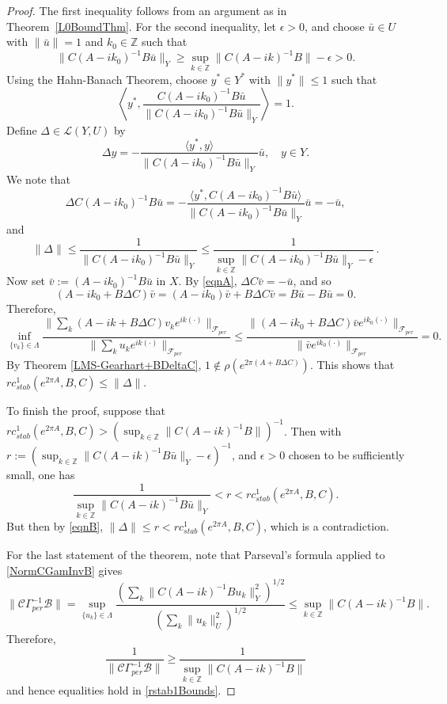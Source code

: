 \documentclass[10pt,psamsfonts,leqno]{siamltex}
\newcommand{\bbZ}{\mathbb{Z}}
\newcommand{\calB}{\mathcal{B}}
\newcommand{\calC}{\mathcal{C}}
\newcommand{\lb}{\label}
\newcommand{\rcstab}{rc_{stab}}
\newcommand{\Gammaper}{\Gamma_{per}}
\newcommand{\Fper}{{\mathcal{F}_{per}}}
\begin{document}
\begin{proof}  The first inequality follows from an argument as in
Theorem~\ref{L0BoundThm}.  For the second inequality, let $\epsilon>0$,
and choose $\bar u\in U$ with $\|\bar u\|=1$ and $k_0\in\bbZ$ such that
\[
\|C(A-ik_0)^{-1}B\bar{u}\|_Y\ge
\sup_{k\in\bbZ}\|C(A-ik)^{-1}B\|-\epsilon>0.
\]
Using the Hahn-Banach Theorem, choose $y^*\in Y^*$ with
$\|y^*\|\le 1$ such that
\[
\left\langle y^*,\frac{C(A-ik_0)^{-1}B\bar{u}}
{\|C(A-ik_0)^{-1}B\bar{u}\|_Y}\right\rangle=1.
\]
Define $\Delta\in \mathcal{L}(Y,U)$ by
\[
\Delta y =
   -\frac{\langle y^*,y\rangle}{\|C(A-ik_0)^{-1}B\bar u\|_Y}\bar{u},
\quad y\in Y.
\]
We note that
\begin{equation}\lb{eqnA}
\Delta C(A-ik_0)^{-1}B\bar u=
-\frac{\langle y^*,C(A-ik_0)^{-1}B\bar u\rangle}
{\|C(A-ik_0)^{-1}B\bar{u}\|_Y}\bar u=-\bar{u},
\end{equation}
and
\begin{equation}\lb{eqnB}
\|\Delta\|\le\frac{1}{\|C(A-ik_0)^{-1}B\bar{u}\|_Y}
\le\frac{1}{\sup_{k\in\bbZ}\|C(A-ik_0)^{-1}B\bar{u}\|_Y-\epsilon}\, .
\end{equation}
Now set $\bar{v}:= (A-ik_0)^{-1}B\bar u$ in $X$.  By \eqref{eqnA},
$\Delta C\bar{v}=-\bar{u}$, and so
\[ (A-ik_0+B\Delta C)\bar{v}
=(A-ik_0)\bar{v}+B\Delta C\bar{v}=B\bar{u}- B\bar{u}=0.\]
Therefore,
\begin{equation*}
\inf_{\{v_k\}\in\Lambda}\frac{\|\sum_k(A-ik+B\Delta C)
   v_ke^{ik(\cdot)}\|_\Fper}{\|\sum_ku_ke^{ik(\cdot)}\|_\Fper}
\le \frac{\|(A-ik_0+B\Delta C)
   \bar{v}e^{ik_0(\cdot)}\|_\Fper}{\|\bar{v}e^{ik_0(\cdot)}\|_\Fper} =0.
\end{equation*}
By Theorem \ref{LMS-Gearhart+BDeltaC},
$1\notin\rho(e^{2\pi(A+B\Delta C)})$.  This shows that
$\rcstab^1(e^{2\pi A},B,C)\le\|\Delta\|$.

To finish the proof, suppose that
$ \rcstab^1(e^{2\pi A},B,C)>(\sup_{k\in\bbZ}\|C(A-ik)^{-1}B\|)^{-1}$.
Then with
$r:=(\sup_{k\in\bbZ}\|C(A-ik)^{-1}B\bar{u}\|_Y-\epsilon)^{-1}$,
 and $\epsilon>0$ chosen to be sufficiently small,
one has
\[ \frac{1}{\sup_{k\in\bbZ}\|C(A-ik)^{-1}B\bar{u}\|_Y}< r <
\rcstab^1(e^{2\pi A},B,C).
\]
But then by \eqref{eqnB}, $\|\Delta\|\le r < \rcstab^1(e^{2\pi A},B,C)$,
which is a contradiction.

For the last statement of the theorem, note that Parseval's formula
applied to
\eqref{NormCGamInvB} gives
\begin{equation}\label{ParForm}
\|\calC\Gammaper^{-1}\calB\|=\sup_{\{u_k\}\in\Lambda}
   \frac{\left(\sum_k\| C(A-ik)^{-1}Bu_k\|^2_Y\right)^{1/2}}
       {\left(\sum_k \|u_k\|^2_U\right)^{1/2}}
\le \sup_{k\in\bbZ}\|C(A-ik)^{-1}B\|.
\end{equation}
Therefore,
\[
\frac{1}{\|\calC\Gammaper^{-1}\calB\|}\ge
\frac{1}{\sup_{k\in\bbZ}\|C(A-ik)^{-1}B\|}
\]
and hence equalities hold in \eqref{rstab1Bounds}.
\end{proof}
\end{document}
